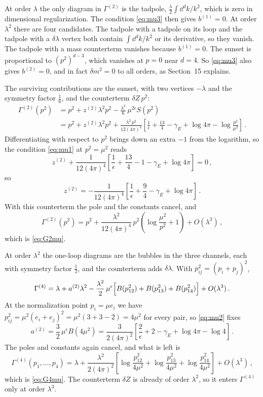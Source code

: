  At order $\lambda$ the only diagram in
$\Gamma^{(2)}$ is the tadpole, $\frac\lambda2\int \dd^dk/k^2$, which is zero in
dimensional regularization. The condition \eqref{eq:mu3} then gives
$b^{(1)}=0$. At order $\lambda^2$ there are four candidates. The tadpole with a
tadpole on its loop and the tadpole with a $\delta\lambda$ vertex both contain
$\int \dd^dk/k^2$ or its derivative, so they vanish. The tadpole with a mass
counterterm vanishes because $b^{(1)}=0$. The sunset is proportional to
$(p^2)^{d-3}$, which vanishes at $p=0$ near $d=4$. So \eqref{eq:mu3} also gives
$b^{(2)}=0$, and in fact $\delta m^2=0$ to all orders, as Section~15 explains.

 The surviving contributions are the sunset, with two
vertices $-\lambda$ and the symmetry factor $\frac16$, and the counterterm
$\delta Z\,p^2$:
\begin{align*}
\Gamma^{(2)}(p^2)&=p^2+z^{(2)}\lambda^2p^2-\frac{\lambda^2}6\,\mu^{2\epsilon}S(p^2)\\
&=p^2+z^{(2)}\lambda^2p^2+\frac{\lambda^2\,p^2}{12(4\pi)^4}\left[\frac1\epsilon+\frac{13}4-\gamma_E+\log4\pi-\log\frac{p^2}{\mu^2}\right]\,.
\end{align*}
Differentiating with respect to $p^2$ brings down an extra $-1$ from the
logarithm, so the condition \eqref{eq:mu1} at $p^2=\mu^2$ reads
\[
z^{(2)}+\frac1{12(4\pi)^4}\left[\frac1\epsilon+\frac{13}4-1-\gamma_E+\log4\pi\right]=0\,,
\]
so
\[
z^{(2)}=-\frac1{12(4\pi)^4}\left[\frac1\epsilon+\frac94-\gamma_E+\log4\pi\right]\,.
\]
With this counterterm the pole and the constants cancel, and
\[
\Gamma^{(2)}(p^2)=p^2+\frac{\lambda^2}{12(4\pi)^4}\,p^2\left(\log\frac{\mu^2}{p^2}+1\right)+O(\lambda^3)\,,
\]
which is \eqref{eq:G2mu}.

 At order $\lambda^2$ the one-loop diagrams are the
bubbles in the three channels, each with symmetry factor $\frac12$, and the
counterterm adds $\delta\lambda$. With $p_{ij}^2=(p_i+p_j)^2$,
\[
\Gamma^{(4)}=\lambda+a^{(2)}\lambda^2-\frac{\lambda^2}2\,\mu^\epsilon\Bigl[B(p_{12}^2)+B(p_{13}^2)+B(p_{14}^2)\Bigr]+O(\lambda^3)\,.
\]
At the normalization point $p_i=\mu e_i$ we have
$p_{ij}^2=\mu^2(e_i+e_j)^2=\mu^2(3+3-2)=4\mu^2$ for every pair, so
\eqref{eq:mu2} fixes
\[
a^{(2)}=\frac32\,\mu^\epsilon B(4\mu^2)=\frac3{2(4\pi)^2}\left[\frac2\epsilon+2-\gamma_E+\log4\pi-\log4\right]\,.
\]
The poles and constants again cancel, and what is left is
\[
\Gamma^{(4)}(p_1,\dots,p_4)=\lambda+\frac{\lambda^2}{2(4\pi)^2}\left[\log\frac{p_{12}^2}{4\mu^2}+\log\frac{p_{13}^2}{4\mu^2}+\log\frac{p_{14}^2}{4\mu^2}\right]+O(\lambda^3)\,,
\]
which is \eqref{eq:G4mu}. The counterterm $\delta Z$ is already of order
$\lambda^2$, so it enters $\Gamma^{(4)}$ only at order $\lambda^3$.

